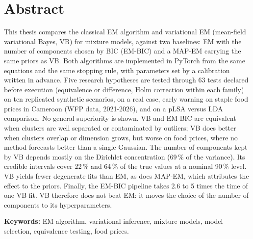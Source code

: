 \chapter*{Abstract}
This thesis compares the classical EM algorithm and variational EM (mean-field variational Bayes, VB) for mixture models, against two baselines: EM with the number of components chosen by BIC (EM-BIC) and a MAP-EM carrying the same priors as VB. Both algorithms are implemented in PyTorch from the same equations and the same stopping rule, with parameters set by a calibration written in advance. Five research hypotheses are tested through 63 tests declared before execution (equivalence or difference, Holm correction within each family) on ten replicated synthetic scenarios, on a real case, early warning on staple food prices in Cameroon (WFP data, 2021-2026), and on a pLSA versus LDA comparison. No general superiority is shown. VB and EM-BIC are equivalent when clusters are well separated or contaminated by outliers; VB does better when clusters overlap or dimension grows, but worse on food prices, where no method forecasts better than a single Gaussian. The number of components kept by VB depends mostly on the Dirichlet concentration (69\,\% of the variance). Its credible intervals cover 22\,\% and 64\,\% of the true values at a nominal 90\,\% level. VB yields fewer degenerate fits than EM, as does MAP-EM, which attributes the effect to the priors. Finally, the EM-BIC pipeline takes 2.6 to 5 times the time of one VB fit. VB therefore does not beat EM: it moves the choice of the number of components to its hyperparameters.

\medskip
\noindent\textbf{Keywords:} EM algorithm, variational inference, mixture models, model selection, equivalence testing, food prices.


